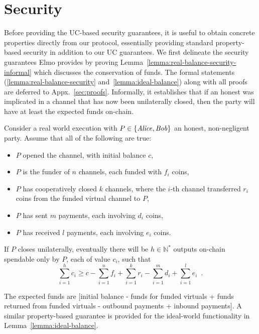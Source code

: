 \section{Security}
  \label{section:security}
    Before providing the UC-based security guarantees, it is useful to obtain
  concrete properties directly from our protocol, essentially providing standard
  property-based security in addition to our UC guarantees. We first delineate the
  security guarantees Elmo provides by proving
  Lemma~\ref{lemma:real-balance-security-informal} which discusses the
  conservation of funds. The formal statements
  (\ref{lemma:real-balance-security} and~\ref{lemma:ideal-balance}) along with
  all proofs are deferred
  to Appx.~\ref{sec:proofs}. Informally, it
  establishes that if an
  honest
%
%
  was implicated in a channel
  that has now been unilaterally closed,
  then the party will have at least the expected funds on-chain.

\begin{lemma}
\label{lemma:real-balance-security-informal}
  Consider a real world execution with $P \in \{\mathit{Alice}, \mathit{Bob}\}$ an honest,
  non-negligent party. Assume that all of the following are true:
  \begin{itemize}
    \item $P$ opened the channel, with initial balance $c$,
    \item $P$ is the funder of $n$ channels, each funded with $f_i$ coins,
    \item $P$ has cooperatively closed $k$ channels, where the $i$-th channel
    transferred $r_i$ coins from the funded virtual channel to $P$,
    \item $P$ has sent $m$ payments, each involving $d_i$ coins,
    \item $P$ has received $l$ payments, each involving $e_i$ coins.
  \end{itemize}
  If $P$ closes unilaterally, eventually there will be $h \in \mathbb{N}^*$ outputs on-chain
  spendable only by $P$, each of value $c_i$, such that
  \begin{equation}
    \sum\limits_{i=1}^h c_i \geq c - \sum\limits_{i=1}^n f_i +
    \sum\limits_{i=1}^k r_i - \sum\limits_{i=1}^m d_i + \sum\limits_{i=1}^l e_i
    \enspace.
  \end{equation}
\end{lemma}

  The expected funds are [initial balance - funds for funded
  virtuals + funds returned from funded virtuals - outbound payments + inbound
  payments]. A
  similar property-based guarantee is provided for the ideal-world functionality
  \fchan in Lemma~\ref{lemma:ideal-balance}.

